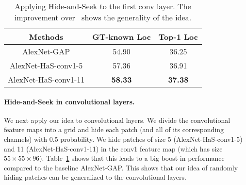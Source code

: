 \begin{table}[t!]
                \begin{center}
                    \footnotesize
                    \begin{tabular}{| c | c | c|}
                    \hline    	
                    Methods & GT-known Loc &  Top-1 Loc \\
                    \hline

                    AlexNet-GAP            & 54.90 & 36.25 \\
                    AlexNet-HaS-conv1-5            & 57.36 & 36.91  \\
                    AlexNet-HaS-conv1-11            &  \textbf{58.33}  & \textbf{37.38}  \\

                    \hline
                     \end{tabular}
                            \caption{Applying Hide-and-Seek to the first conv layer. The improvement over~\cite{zhou-cvpr2016} shows the generality of the idea.}
                            \label{table:conv_results}
                            \end{center}
                            \vspace*{-0.15in}
                            \end{table}


\vspace{-10pt}
\paragraph{Hide-and-Seek in convolutional layers.} We next apply our idea to convolutional layers.  We divide the convolutional feature maps into a grid and hide each patch (and all of its corresponding channels) with 0.5 probability.  We hide patches of size 5 (AlexNet-HaS-conv1-5) and 11 (AlexNet-HaS-conv1-11) in the conv1 feature map (which has size $ 55 \times 55 \times 96$).  Table~\ref{table:conv_results} shows that this leads to a big boost in performance compared to the baseline AlexNet-GAP. This shows that our idea of randomly hiding patches can be generalized to the convolutional layers. 





